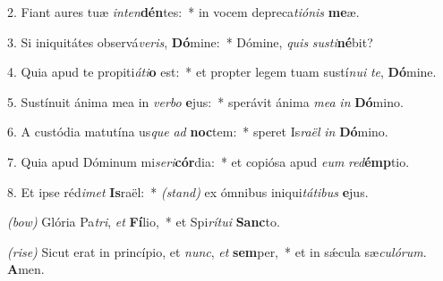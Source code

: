2. Fiant aures tuæ \textit{in}\textit{ten}\textbf{dén}tes:~* in vocem depreca\textit{ti}\textit{ó}\textit{nis} \textbf{me}æ.

3. Si iniquitátes observá\textit{ve}\textit{ris}, \textbf{Dó}mine:~* Dómine, \textit{quis} \textit{sus}\textit{ti}\textbf{né}bit?

4. Quia apud te propiti\textit{á}\textit{ti}\textbf{o} est:~* et propter legem tuam sustí\textit{nu}\textit{i} \textit{te}, \textbf{Dó}mine.

5. Sustínuit ánima mea in \textit{ver}\textit{bo} \textbf{e}jus:~* sperávit ánima \textit{me}\textit{a} \textit{in} \textbf{Dó}mino.

6. A custódia matutína us\textit{que} \textit{ad} \textbf{noc}tem:~* speret Is\textit{ra}\textit{ël} \textit{in} \textbf{Dó}mino.

7. Quia apud Dóminum mi\textit{se}\textit{ri}\textbf{cór}dia:~* et copiósa apud \textit{e}\textit{um} \textit{red}\textbf{émp}tio.

8. Et ipse réd\textit{i}\textit{met} \textbf{Is}raël:~* {\color{red}\textit{(stand)}} ex ómnibus iniqui\textit{tá}\textit{ti}\textit{bus} \textbf{e}jus.

{\color{red}\textit{(bow)}} Glória Pa\textit{tri}, \textit{et} \textbf{Fí}lio,~* et Spi\textit{rí}\textit{tu}\textit{i} \textbf{Sanc}to.

{\color{red}\textit{(rise)}} Sicut erat in princípio, et \textit{nunc}, \textit{et} \textbf{sem}per,~* et in s\'{\ae}cula sæ\textit{cu}\textit{ló}\textit{rum}. \textbf{A}men.